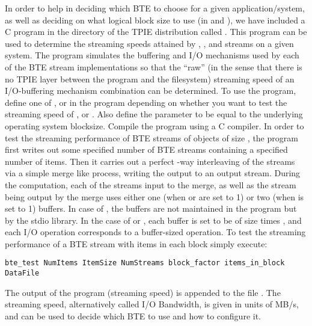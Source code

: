 In order to help in deciding which BTE to choose for a given
application/system, as well as deciding on what logical
block size to use (in  and
), we have included a C program in the
 directory of the TPIE distribution called
.  This program can be used to determine
the streaming speeds attained by ,
, and  streams on a given
system. The program simulates the buffering and I/O
mechanisms used by each of the BTE stream implementations so
that the ``raw'' (in the sense that there is no TPIE layer
between the program and the filesystem) streaming speed of
an I/O-buffering mechanism combination can be determined. To
use the program, define one of ,
or  in the program depending on whether
you want to test the streaming speed of ,
 or . Also define the
 parameter to be equal to the
underlying operating system blocksize. Compile the program using a C compiler. In
order to test the streaming performance of BTE streams of
objects of size , the program first writes
out some specified number  of BTE streams
containing a specified number  of items.
Then it carries out a perfect -way
interleaving of the streams via a simple merge like process,
writing the output to an output stream. During the
computation, each of the  streams input
to the merge, as well as the stream being output by the
merge uses either one (when  or
 are set to 1) or two (when
 is set to 1) buffers.  In case of
, the buffers are not maintained in the
program but by the stdio library. In the case of
 or , each
buffer is set to be of size  times
, and each I/O operation
corresponds to a buffer-sized operation. To test the
streaming performance of a BTE stream with
 items in each block simply
execute:
\begin{verbatim}
bte_test NumItems ItemSize NumStreams block_factor items_in_block DataFile 
\end{verbatim}
The output of the program (streaming speed) is appended to the file
. The streaming speed, alternatively called I/O Bandwidth,
is given in units of MB/s, and can be used to decide which BTE to use and
how to configure it.


